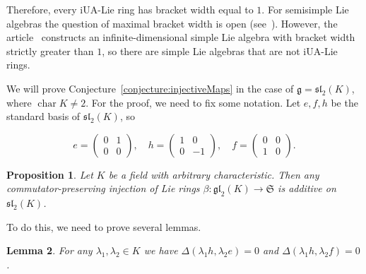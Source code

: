 \documentclass[a4paper,reqno,12pt]{amsart}
\newtheorem{proposition}{Proposition}[section]
\newtheorem{lemma}[proposition]{Lemma}
\theoremstyle{definition}
\theoremstyle{remark}
\DeclareMathOperator{\Char}{char}
\def\SSS{\mathfrak{S}}
\def\ggg{\mathfrak{g}}
\def\gl{\mathfrak{gl}}
\def\sl{\mathfrak{sl}}
\begin{document}
	Therefore, every iUA-Lie ring has bracket width equal to $1$. For semisimple Lie algebras the question of maximal bracket width is open (see~\cite{kunyavskii2021bracket}). However, the article~\cite{kunyavskii2021bracket} constructs an infinite-dimensional simple Lie algebra with bracket width strictly greater than $1$, so there are simple Lie algebras that are not iUA-Lie rings.

	We will prove Conjecture~\ref{conjecture:injectiveMaps} in the case of $\ggg = \sl_2(K)$, where $\Char K \neq 2$. For the proof, we need to fix some notation. Let $e, f, h$ be the standard basis of $\sl_2(K)$, so

	\begin{equation*}
		e = 
		\begin{pmatrix}
			0 & 1 \\
			0 & 0
		\end{pmatrix}, \quad
		h =
		\begin{pmatrix}
			1 & 0 \\
			0 & -1
		\end{pmatrix}, \quad
		f = 
		\begin{pmatrix}
			0 & 0 \\
			1 & 0
		\end{pmatrix}.
	\end{equation*}

	\begin{proposition}\label{proposition:injectionsForgl2}
		Let $K$ be a field with arbitrary characteristic. Then any commutator-preserving injection of Lie rings $\beta : \gl_2(K) \rightarrow \SSS$ is additive on $\sl_2(K)$.
	\end{proposition}

	To do this, we need to prove several lemmas.

	\begin{lemma}\label{lemma:additivityForEandH}
		For any $\lambda_1, \lambda_2 \in K$ we have $\Delta(\lambda_1 h, \lambda_2 e) = 0$ and $\Delta(\lambda_1 h, \lambda_2 f) = 0$.
	\end{lemma}
\end{document}

